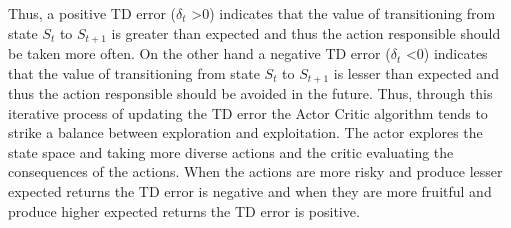 \documentclass{article}
\begin{document}
Thus, a positive TD error ($\delta_{t}$ \textgreater 0) indicates that the value of transitioning from state $S_t$ to $S_{t+1}$ is greater than expected and thus the action responsible should be taken more often. On the other hand a negative TD error ($\delta_{t}$ \textless 0) indicates that the value of transitioning from state $S_t$ to $S_{t+1}$ is lesser than expected and thus the action responsible should be avoided in the future. Thus, through this iterative process of updating the TD error the Actor Critic algorithm tends to strike a balance between exploration and exploitation. The actor explores the state space and taking more diverse actions and the critic evaluating the consequences of the actions. When the actions are more risky and produce lesser expected returns the TD error is negative and when they are more fruitful and produce higher expected returns the TD error is positive.
\end{document}
